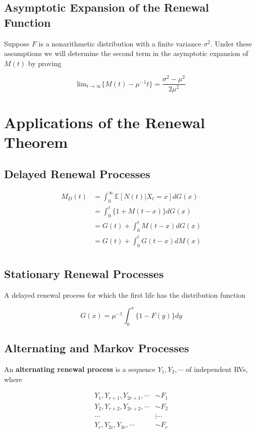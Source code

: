 \documentclass[12pt]{article}
\theoremstyle{nonumberbreak}
\begin{document}
\subsection{Asymptotic Expansion of the Renewal Function}

Suppose $F$ is a nonarithmetic distribution with a finite variance $\sigma^2$. Under these assumptions we will determine the second term in the asymptotic expansion of $M(t)$ by proving

$$
\mathrm{lim}_{t\to\infty} \{ M(t) - \mu^{-1}t \} = \frac{\sigma^2 - \mu^2}{2\mu^2}
$$



\section{Applications of the Renewal Theorem}

\subsection{Delayed Renewal Processes}

$$
\begin{aligned}
M_D(t) &= \int_0^\infty \mathbb{E}[N(t) | X_t = x ] dG(x) \\[8pt]
&= \int_0^t \{ 1 + M(t-x) \} dG(x) \\[8pt]
&= G(t) + \int_0^t M(t-x) dG(x) \\[8pt]
&= G(t) + \int_0^t G(t-x) dM(x) \\[8pt]
\end{aligned}
$$



\subsection{Stationary Renewal Processes}

A delayed renewal process for which the first life has the distribution
function

$$
G(x) = \mu^{-1} \int_0^x \{ 1 - F(y) \} dy
$$




\subsection{Alternating and Markov Processes}

An \textbf{alternating renewal process} is a sequence $Y_1, Y_2, \cdots$ of independent RVs, where

$$
\begin{aligned}
Y_1, Y_{r+1}, Y_{2r+1}, \cdots &\sim F_1 \\[8pt]
Y_2, Y_{r+2}, Y_{2r+2}, \cdots &\sim F_2 \\[8pt]
\cdots &\vdots \cdots \\[8pt]
Y_r, Y_{2r},  Y_{3r},   \cdots &\sim F_r \\[8pt]
\end{aligned}
$$
\end{document}
